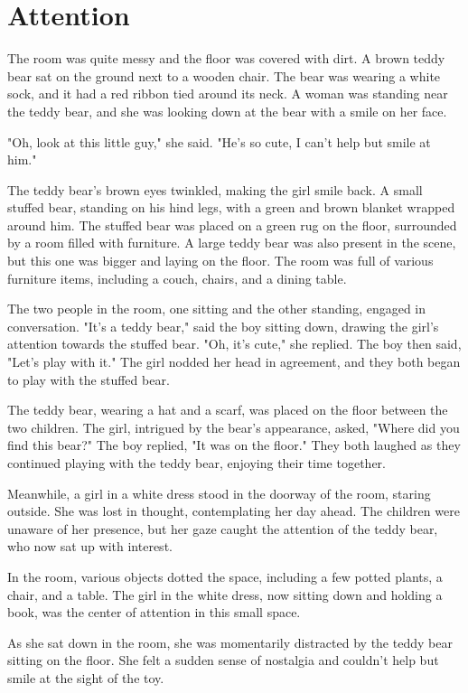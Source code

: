 \documentclass[smalldemyvopaper,11pt,twoside,onecolumn,openright,extrafontsizes]{memoir}
\begin{document}
\chapter{Attention}
The room was quite messy and the floor was covered with dirt. A brown teddy bear sat on the ground next to a wooden chair. The bear was wearing a white sock, and it had a red ribbon tied around its neck. A woman was standing near the teddy bear, and she was looking down at the bear with a smile on her face.\par
"Oh, look at this little guy," she said. "He's so cute, I can't help but smile at him."\par
The teddy bear's brown eyes twinkled, making the girl smile back. A small stuffed bear, standing on his hind legs, with a green and brown blanket wrapped around him. The stuffed bear was placed on a green rug on the floor, surrounded by a room filled with furniture. A large teddy bear was also present in the scene, but this one was bigger and laying on the floor. The room was full of various furniture items, including a couch, chairs, and a dining table.\par
The two people in the room, one sitting and the other standing, engaged in conversation. "It's a teddy bear," said the boy sitting down, drawing the girl's attention towards the stuffed bear. "Oh, it's cute," she replied. The boy then said, "Let's play with it." The girl nodded her head in agreement, and they both began to play with the stuffed bear.\par
The teddy bear, wearing a hat and a scarf, was placed on the floor between the two children. The girl, intrigued by the bear's appearance, asked, "Where did you find this bear?" The boy replied, "It was on the floor." They both laughed as they continued playing with the teddy bear, enjoying their time together.\par
Meanwhile, a girl in a white dress stood in the doorway of the room, staring outside. She was lost in thought, contemplating her day ahead. The children were unaware of her presence, but her gaze caught the attention of the teddy bear, who now sat up with interest.\par
In the room, various objects dotted the space, including a few potted plants, a chair, and a table. The girl in the white dress, now sitting down and holding a book, was the center of attention in this small space.\par
As she sat down in the room, she was momentarily distracted by the teddy bear sitting on the floor. She felt a sudden sense of nostalgia and couldn't help but smile at the sight of the toy.\par
\end{document}
